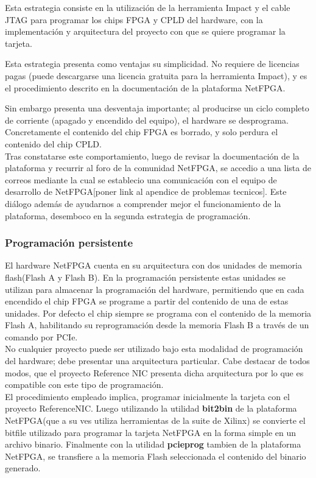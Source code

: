 Esta estrategia consiste en la utilizaci\'on de la herramienta Impact y el cable JTAG para programar los chips FPGA y CPLD del hardware, con la implementaci\'on y arquitectura del proyecto con que se quiere programar la tarjeta.

Esta estrategia presenta como ventajas su simplicidad. No requiere de licencias pagas (puede descargarse una licencia gratuita para la herramienta Impact), y es el procedimiento descrito en la documentaci\'on de la plataforma NetFPGA.

Sin embargo presenta una desventaja importante; al producirse un ciclo completo de corriente (apagado y encendido del equipo), el hardware se desprograma. Concretamente el contenido del chip FPGA es borrado, y solo perdura el contenido del chip CPLD.\\

Tras constatarse este comportamiento, luego de revisar la documentaci\'on de la plataforma y recurrir al foro de la comunidad NetFPGA, se accedio a una lista de correos mediante la cual se establecio una comunicaci\'on con el equipo de desarrollo de NetFPGA[poner link al apendice de problemas tecnicos]. Este di\'alogo adem\'as de ayudarnos a comprender mejor el funcionamiento de la plataforma, desemboco en la segunda estrategia de programaci\'on.

\subsubsection{Programaci\'on persistente}
El hardware NetFPGA cuenta en su arquitectura con dos unidades de memoria flash(Flash A y Flash B). En la programaci\'on persistente estas unidades se utilizan para almacenar la programaci\'on del hardware, permitiendo que en cada encendido el chip FPGA se programe a partir del contenido de una de estas unidades. Por defecto el chip siempre se programa con el contenido de la memoria Flash A, habilitando su reprogramaci\'on desde la memoria Flash B a trav\'es de un comando por PCIe.\\

No cualquier proyecto puede ser utilizado bajo esta modalidad de programaci\'on del hardware; debe presentar una arquitectura particular. Cabe destacar de todos modos, que el proyecto Reference NIC presenta dicha arquitectura por lo que es compatible con este tipo de programaci\'on.\\

El procedimiento empleado implica, programar inicialmente la tarjeta con el proyecto ReferenceNIC. Luego utilizando la utilidad \textbf{bit2bin} de la plataforma NetFPGA(que a su ves utiliza herramientas de la suite de Xilinx) se convierte el bitfile utilizado para programar la tarjeta NetFPGA en la forma simple en un archivo binario. Finalmente con la utilidad \textbf{pcieprog}  tambien de la plataforma NetFPGA, se transfiere a la memoria Flash seleccionada el contenido del binario generado.\\

